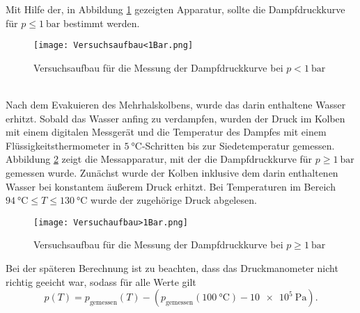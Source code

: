 Mit Hilfe der, in Abbildung \ref{Versuchsaufbau<1} gezeigten Apparatur, sollte die Dampfdruckkurve für $p\leq \SI{1}{\bar}$ bestimmt werden.
\begin{figure}[h!]
	\centering
	\texttt{[image: Versuchsaufbau<1Bar.png]}
	\caption{Versuchsaufbau für die Messung der Dampfdruckkurve bei $p<\SI{1}{\bar}$\cite{V203}}
	\label{Versuchsaufbau<1}
\end{figure} \\
Nach dem Evakuieren des Mehrhalskolbens, wurde das darin enthaltene Wasser erhitzt. Sobald das Wasser anfing zu verdampfen, wurden der Druck im Kolben mit einem digitalen Messgerät und die Temperatur des Dampfes mit einem Flüssigkeitsthermometer in $\SI{5}{\celsius}$-Schritten bis zur Siedetemperatur gemessen. \\
\newpage
Abbildung \ref{Versuchsaufbau>1} zeigt die Messapparatur, mit der die Dampfdruckkurve für $p \geq \SI{1}{\bar}$ gemessen wurde. Zunächst wurde der Kolben inklusive dem darin enthaltenen Wasser bei konstantem äußerem Druck erhitzt. Bei Temperaturen im Bereich $\SI{94}{\celsius}\leq T\leq\SI{130}{\celsius}$ wurde der zugehörige Druck abgelesen.
\begin{figure}
	\centering
	\texttt{[image: Versuchaufbau>1Bar.png]}
	\caption{Versuchsaufbau für die Messung der Dampfdruckkurve bei $p\geq\SI{1}{\bar}$\cite{V203}}
	\label{Versuchsaufbau>1}
\end{figure}
Bei der späteren Berechnung ist zu beachten, dass das Druckmanometer nicht richtig geeicht war, sodass für alle Werte gilt
\begin{equation}
	p(T) = p_\text{gemessen}(T) - (p_\text{gemessen}(\SI{100}{\celsius})-\SI{10e+5}{\pascal}).
\end{equation}